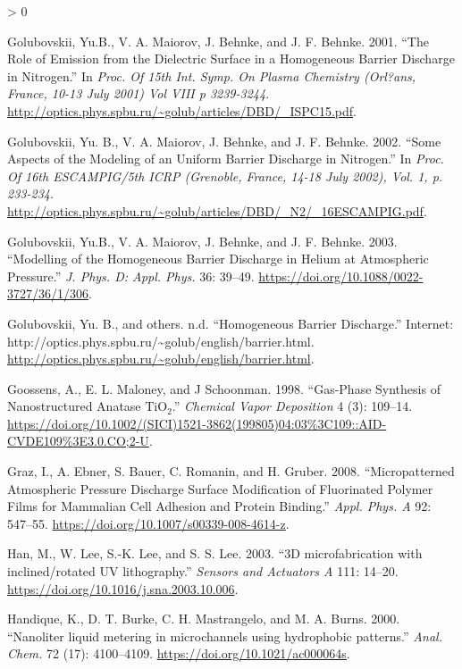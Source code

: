 \documentclass[
  10pt,
  twoside]{article}
\newlength{\cslhangindent}
\newenvironment{CSLReferences}[2] %
 {%
  \setlength{\parindent}{0pt}
  \ifodd #1 \everypar{\setlength{\hangindent}{\cslhangindent}}\ignorespaces\fi
  \ifnum #2 > 0
  \setlength{\parskip}{#2\baselineskip}
  \fi
 }%
 {}
\begin{document}
\begin{CSLReferences}{1}{0}
\leavevmode\hypertarget{ref-Golub01}{}%
Golubovskii, Yu.B., V. A. Maiorov, J. Behnke, and J. F. Behnke. 2001. {``The Role of Emission from the Dielectric Surface in a Homogeneous Barrier Discharge in Nitrogen.''} In \emph{Proc. Of 15th Int. Symp. On Plasma Chemistry (Orl?ans, France, 10-13 July 2001) Vol VIII p 3239-3244}. \url{http://optics.phys.spbu.ru/~golub/articles/DBD/_ISPC15.pdf}.

\leavevmode\hypertarget{ref-Golub02}{}%
Golubovskii, Yu. B., V. A. Maiorov, J. Behnke, and J. F. Behnke. 2002. {``Some Aspects of the Modeling of an Uniform Barrier Discharge in Nitrogen.''} In \emph{Proc. Of 16th ESCAMPIG/5th ICRP (Grenoble, France, 14-18 July 2002), Vol. 1, p. 233-234}. \url{http://optics.phys.spbu.ru/~golub/articles/DBD/_N2/_16ESCAMPIG.pdf}.

\leavevmode\hypertarget{ref-Golub03}{}%
Golubovskii, Yu.B., V. A. Maiorov, J. Behnke, and J. F. Behnke. 2003. {``Modelling of the Homogeneous Barrier Discharge in Helium at Atmospheric Pressure.''} \emph{J. Phys. D: Appl. Phys.} 36: 39--49. \url{https://doi.org/10.1088/0022-3727/36/1/306}.

\leavevmode\hypertarget{ref-GolubWeb}{}%
Golubovskii, Yu. B., and others. n.d. {``Homogeneous Barrier Discharge.''} Internet: http://optics.phys.spbu.ru/\textasciitilde golub/english/barrier.html. \url{http://optics.phys.spbu.ru/~golub/english/barrier.html}.

\leavevmode\hypertarget{ref-Goos1998}{}%
Goossens, A., E. L. Maloney, and J Schoonman. 1998. {``Gas-Phase Synthesis of Nanostructured Anatase \(\mathrm{TiO_2}\).''} \emph{Chemical Vapor Deposition} 4 (3): 109--14. \url{https://doi.org/10.1002/(SICI)1521-3862(199805)04:03\%3C109::AID-CVDE109\%3E3.0.CO;2-U}.

\leavevmode\hypertarget{ref-Graz08}{}%
Graz, I., A. Ebner, S. Bauer, C. Romanin, and H. Gruber. 2008. {``Micropatterned Atmospheric Pressure Discharge Surface Modification of Fluorinated Polymer Films for Mammalian Cell Adhesion and Protein Binding.''} \emph{Appl. Phys. A} 92: 547--55. \url{https://doi.org/10.1007/s00339-008-4614-z}.

\leavevmode\hypertarget{ref-Han04}{}%
Han, M., W. Lee, S.-K. Lee, and S. S. Lee. 2003. {``{3D microfabrication with inclined/rotated UV lithography}.''} \emph{Sensors and Actuators A} 111: 14--20. \url{https://doi.org/10.1016/j.sna.2003.10.006}.

\leavevmode\hypertarget{ref-Hand00}{}%
Handique, K., D. T. Burke, C. H. Mastrangelo, and M. A. Burns. 2000. {``{Nanoliter liquid metering in microchannels using hydrophobic patterns}.''} \emph{Anal. Chem.} 72 (17): 4100--4109. \url{https://doi.org/10.1021/ac000064s}.


\end{CSLReferences}
\end{document}

